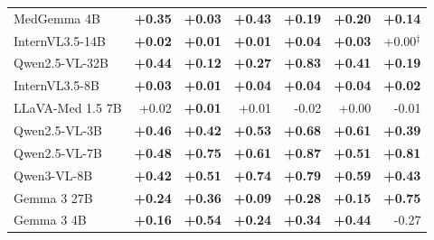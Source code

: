 \begin{table}[h]
\begin{tabular}{lrrrrrr}
MedGemma 4B & \cellcolor{cfSlate4}\textbf{+0.35} & \cellcolor{cfSlate2}\textbf{+0.03} & \cellcolor{cfSlate4}\textbf{+0.43} & \cellcolor{cfSlate3}\textbf{+0.19} & \cellcolor{cfSlate3}\textbf{+0.20} & \cellcolor{cfSlate3}\textbf{+0.14} \\
InternVL3.5-14B & \cellcolor{cfSlate1}\textbf{+0.02} & \cellcolor{cfSlate1}\textbf{+0.01} & \cellcolor{cfSlate1}\textbf{+0.01} & \cellcolor{cfSlate2}\textbf{+0.04} & \cellcolor{cfSlate2}\textbf{+0.03} & \cellcolor{cfSlate1}+0.00$^{\ddagger}$ \\
Qwen2.5-VL-32B & \cellcolor{cfSlate4}\textbf{+0.44} & \cellcolor{cfSlate3}\textbf{+0.12} & \cellcolor{cfSlate4}\textbf{+0.27} & \cellcolor{cfSlate4}\textbf{+0.83} & \cellcolor{cfSlate4}\textbf{+0.41} & \cellcolor{cfSlate3}\textbf{+0.19} \\
InternVL3.5-8B & \cellcolor{cfSlate2}\textbf{+0.03} & \cellcolor{cfSlate1}\textbf{+0.01} & \cellcolor{cfSlate2}\textbf{+0.04} & \cellcolor{cfSlate2}\textbf{+0.04} & \cellcolor{cfSlate2}\textbf{+0.04} & \cellcolor{cfSlate1}\textbf{+0.02} \\
LLaVA-Med 1.5 7B & \cellcolor{cfSlate1}+0.02 & \cellcolor{cfSlate1}\textbf{+0.01} & \cellcolor{cfSlate1}+0.01 & \cellcolor{cfTerra2}-0.02 & \cellcolor{cfSlate1}+0.00 & \cellcolor{cfTerra1}-0.01 \\
Qwen2.5-VL-3B & \cellcolor{cfSlate4}\textbf{+0.46} & \cellcolor{cfSlate4}\textbf{+0.42} & \cellcolor{cfSlate4}\textbf{+0.53} & \cellcolor{cfSlate4}\textbf{+0.68} & \cellcolor{cfSlate4}\textbf{+0.61} & \cellcolor{cfSlate4}\textbf{+0.39} \\
Qwen2.5-VL-7B & \cellcolor{cfSlate4}\textbf{+0.48} & \cellcolor{cfSlate4}\textbf{+0.75} & \cellcolor{cfSlate4}\textbf{+0.61} & \cellcolor{cfSlate4}\textbf{+0.87} & \cellcolor{cfSlate4}\textbf{+0.51} & \cellcolor{cfSlate4}\textbf{+0.81} \\
Qwen3-VL-8B & \cellcolor{cfSlate4}\textbf{+0.42} & \cellcolor{cfSlate4}\textbf{+0.51} & \cellcolor{cfSlate4}\textbf{+0.74} & \cellcolor{cfSlate4}\textbf{+0.79} & \cellcolor{cfSlate4}\textbf{+0.59} & \cellcolor{cfSlate4}\textbf{+0.43} \\
Gemma 3 27B & \cellcolor{cfSlate3}\textbf{+0.24} & \cellcolor{cfSlate4}\textbf{+0.36} & \cellcolor{cfSlate2}\textbf{+0.09} & \cellcolor{cfSlate4}\textbf{+0.28} & \cellcolor{cfSlate3}\textbf{+0.15} & \cellcolor{cfSlate4}\textbf{+0.75} \\
Gemma 3 4B & \cellcolor{cfSlate3}\textbf{+0.16} & \cellcolor{cfSlate4}\textbf{+0.54} & \cellcolor{cfSlate3}\textbf{+0.24} & \cellcolor{cfSlate4}\textbf{+0.34} & \cellcolor{cfSlate4}\textbf{+0.44} & \cellcolor{cfTerra4}-0.27 \\

\end{tabular}
\end{table}

